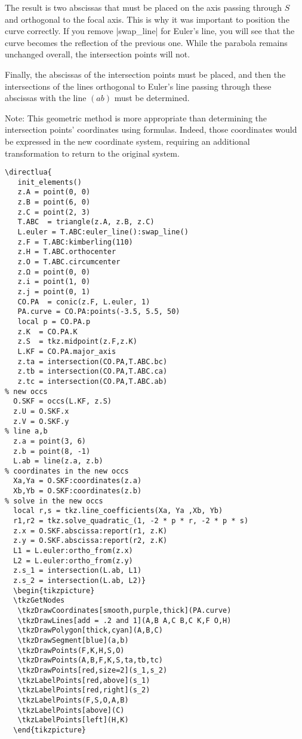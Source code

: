 The result is two abscissas that must be placed on the axis passing through $S$ and orthogonal to the focal axis. This is why it was important to position the curve correctly. If you remove |swap_line| for Euler's line, you will see that the curve becomes the reflection of the previous one. While the parabola remains unchanged overall, the intersection points will not.

Finally, the abscissas of the intersection points must be placed, and then the intersections of the lines orthogonal to Euler's line passing through these abscissas with the line $(ab)$ must be determined.

Note: This geometric method is more appropriate than determining the intersection points' coordinates using formulas. Indeed, those coordinates would be expressed in the new coordinate system, requiring an additional transformation to return to the original system.
  
\begin{verbatim}
\directlua{
   init_elements()
   z.A = point(0, 0)
   z.B = point(6, 0)
   z.C = point(2, 3)
   T.ABC  = triangle(z.A, z.B, z.C)
   L.euler = T.ABC:euler_line():swap_line()
   z.F = T.ABC:kimberling(110) 
   z.H = T.ABC.orthocenter
   z.O = T.ABC.circumcenter
   z.Ω = point(0, 0)
   z.i = point(1, 0)
   z.j = point(0, 1)         
   CO.PA  = conic(z.F, L.euler, 1)
   PA.curve = CO.PA:points(-3.5, 5.5, 50)
   local p = CO.PA.p
   z.K  = CO.PA.K
   z.S  = tkz.midpoint(z.F,z.K)
   L.KF = CO.PA.major_axis
   z.ta = intersection(CO.PA,T.ABC.bc)
   z.tb = intersection(CO.PA,T.ABC.ca)
   z.tc = intersection(CO.PA,T.ABC.ab)
% new occs
  O.SKF = occs(L.KF, z.S)
  z.U = O.SKF.x
  z.V = O.SKF.y
% line a,b
  z.a = point(3, 6)
  z.b = point(8, -1)
  L.ab = line(z.a, z.b)
% coordinates in the new occs
  Xa,Ya = O.SKF:coordinates(z.a)
  Xb,Yb = O.SKF:coordinates(z.b)
% solve in the new occs
  local r,s = tkz.line_coefficients(Xa, Ya ,Xb, Yb)
  r1,r2 = tkz.solve_quadratic_(1, -2 * p * r, -2 * p * s)
  z.x = O.SKF.abscissa:report(r1, z.K)
  z.y = O.SKF.abscissa:report(r2, z.K)
  L1 = L.euler:ortho_from(z.x)
  L2 = L.euler:ortho_from(z.y)
  z.s_1 = intersection(L.ab, L1)
  z.s_2 = intersection(L.ab, L2)}  
  \begin{tikzpicture}
  \tkzGetNodes 
   \tkzDrawCoordinates[smooth,purple,thick](PA.curve)
   \tkzDrawLines[add = .2 and 1](A,B A,C B,C K,F O,H)
   \tkzDrawPolygon[thick,cyan](A,B,C)
   \tkzDrawSegment[blue](a,b)
   \tkzDrawPoints(F,K,H,S,O)
   \tkzDrawPoints(A,B,F,K,S,ta,tb,tc)
   \tkzDrawPoints[red,size=2](s_1,s_2)
   \tkzLabelPoints[red,above](s_1)
   \tkzLabelPoints[red,right](s_2)
   \tkzLabelPoints(F,S,O,A,B)
   \tkzLabelPoints[above](C)
   \tkzLabelPoints[left](H,K)
  \end{tikzpicture}
\end{verbatim}

